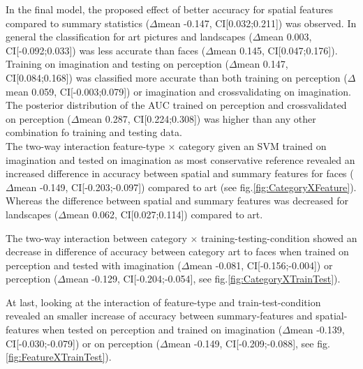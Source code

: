 \documentclass[a4paper,man,natbib,floatsintext]{apa6}
\begin{document}
In the final model, the proposed effect of better accuracy for spatial features compared to summary statistics ($\Delta$mean -0.147, CI[0.032;0.211]) was observed. 
In general the classification for art pictures and  landscapes ($\Delta$mean 0.003, CI[-0.092;0.033]) was less accurate than faces ($\Delta$mean 0.145, CI[0.047;0.176]). 
Training on imagination and testing on perception ($\Delta$mean 0.147, CI[0.084;0.168]) was classified more accurate than both training on perception ($\Delta$mean 0.059, CI[-0.003;0.079]) or imagination and crossvalidating on imagination. The posterior distribution of the AUC trained on perception and crossvalidated on perception ($\Delta$mean 0.287, CI[0.224;0.308]) was higher than any other combination fo training and testing data. \\

The two-way interaction feature-type $\times$ category given an SVM trained on imagination and tested on imagination as most conservative reference revealed an increased difference in accuracy between spatial and summary features for faces ($\Delta$mean -0.149, CI[-0.203;-0.097]) compared to art (see fig.\ref{fig:CategoryXFeature}). 
Whereas the difference between spatial and summary features was decreased for landscapes ($\Delta$mean 0.062, CI[0.027;0.114]) compared to art. 

The two-way interaction between category $\times$ training-testing-condition showed an decrease in difference of accuracy between category art to faces when trained on perception and tested with imagination ($\Delta$mean -0.081, CI[-0.156;-0.004]) or perception ($\Delta$mean -0.129, CI[-0.204;-0.054], see fig.\ref{fig:CategoryXTrainTest}). 

At last, looking at the interaction of feature-type and train-test-condition revealed an smaller increase of accuracy between summary-features and spatial-features when tested on perception and trained on imagination ($\Delta$mean -0.139, CI[-0.030;-0.079]) or on perception ($\Delta$mean -0.149, CI[-0.209;-0.088], see fig.\ref{fig:FeatureXTrainTest}).


\newpage
\end{document}
